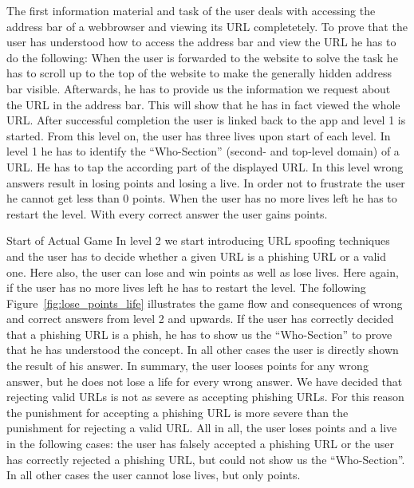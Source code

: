 \begin{description}[leftmargin=0cm]
	\item[Basic Knowledge]  The first information material and task of the user deals with accessing the address bar of a webbrowser and viewing its URL completetely.
 To prove that the user has understood how to access the address bar and view the URL he has to do the following: When the user is forwarded to the website to solve the task he has to scroll up to the top of the website to make the generally hidden address bar visible.
 Afterwards, he has to provide us the information we request about the URL in the address bar.
 This will show that he has in fact viewed the whole URL.
 After successful completion the user is linked back to the app and level 1 is started.
 From this level on, the user has three lives upon start of each level.
 In level 1 he has to identify the ``Who-Section'' (second- and top-level domain) of a URL.
 He has to tap the according part of the displayed URL.
 In this level wrong answers result in losing points and losing a live.
 In order not to frustrate the user he cannot get less than 0 points.
 When the user has no more lives left he has to restart the level.
 With every correct answer the user gains points.
	\item{Start of Actual Game}  In level 2 we start introducing URL spoofing techniques and the user has to decide whether a given URL is a phishing URL or a valid one.
 Here also, the user can lose and win points as well as lose lives.
 Here again, if the user has no more lives left he has to restart the level.
 The following Figure~\ref{fig:lose_points_life} illustrates the game flow and consequences of wrong and correct answers from level 2 and upwards.
 If the user has correctly decided that a phishing URL is a phish, he has to show us the ``Who-Section'' to prove that he has understood the concept.
 In all other cases the user is directly shown the result of his answer.
 In summary, the user looses points for any wrong answer, but he does not lose a life for every wrong answer.
 We have decided that rejecting valid URLs is not as severe as accepting phishing URLs.
 For this reason the punishment for accepting a phishing URL is more severe than the punishment for rejecting a valid URL.
 All in all, the user loses points and a live in the following cases: the user has falsely accepted a phishing URL or the user has correctly rejected a phishing URL, but could not show us the ``Who-Section''. In all other cases the user cannot lose lives, but only points.
\end{description}

